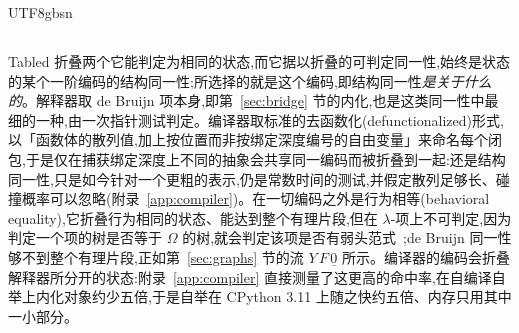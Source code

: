 \begin{CJK*}{UTF8}{gbsn}
  \subsection{}\label{sec:design-space}
  \ifPaperChinese
  \textsf{Tabled} 折叠两个它能判定为相同的状态,而它据以折叠的可判定同一性,始终是状态的某个一阶编码的结构同一性;所选择的就是这个编码,即结构同一性\emph{是关于什么的}。解释器取 de Bruijn 项本身,即第~\ref{sec:bridge} 节的内化,也是这类同一性中最细的一种,由一次指针测试判定。编译器取标准的去函数化(defunctionalized)形式,以「函数体的散列值,加上按位置而非按绑定深度编号的自由变量」来命名每个闭包,于是仅在捕获绑定深度上不同的抽象会共享同一编码而被折叠到一起:还是结构同一性,只是如今针对一个更粗的表示,仍是常数时间的测试,并假定散列足够长、碰撞概率可以忽略(附录~\ref{app:compiler})。在一切编码之外是行为相等(behavioral equality),它折叠行为相同的状态、能达到整个有理片段,但在 $\lambda$-项上不可判定,因为判定一个项的树是否等于 $\Omega$ 的树,就会判定该项是否有弱头范式~\cite{barendregt1984-lambda-calculus};de Bruijn 同一性够不到整个有理片段,正如第~\ref{sec:graphs} 节的流 $Y\,F\,\underline{0}$ 所示。编译器的编码会折叠解释器所分开的状态:附录~\ref{app:compiler} 直接测量了这更高的命中率,在自编译自举上内化对象约少五倍,于是自举在 CPython 3.11 上随之快约五倍、内存只用其中一小部分。


\end{CJK*}
